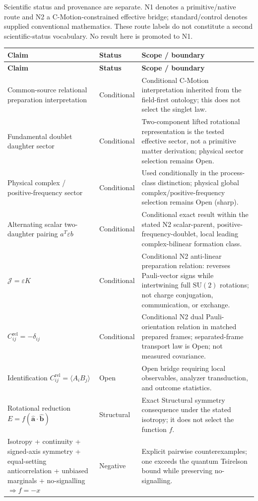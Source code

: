 \documentclass[11pt]{article}
\theoremstyle{remark}
\newcommand{\cmotion}{\mbox{C-Motion}}
\newcommand{\SU}{\mathrm{SU}(2)}
\newcommand{\ahat}{\hat{\bm a}}
\newcommand{\bhat}{\hat{\bm b}}
\newcommand{\epsm}{\varepsilon}
\newcommand{\Jmap}{\mathcal J}
\newcommand{\Crel}{C^{\mathrm{rel}}}
\begin{document}
Scientific status and provenance are separate.  N1 denotes a primitive/native
route and N2 a C-Motion-constrained effective bridge; standard/control denotes
supplied conventional mathematics.  These route labels do not constitute a
second scientific-status vocabulary.  No result here is promoted to N1.

\begingroup
\small
\setlength{\tabcolsep}{3pt}
\begin{longtable}{P{5.0cm}P{3.6cm}P{6.2cm}}
\toprule
\textbf{Claim} & \textbf{Status} & \textbf{Scope / boundary}\\
\midrule
\endfirsthead
\toprule
\textbf{Claim} & \textbf{Status} & \textbf{Scope / boundary}\\
\midrule
\endhead
Common-source relational preparation interpretation & Conditional & Conditional \cmotion{} interpretation inherited from the field-first ontology; this does not select the singlet law.\\
Fundamental doublet daughter sector & Conditional & Two-component lifted rotational representation is the tested effective sector, not a primitive matter derivation; physical sector selection remains Open.\\
Physical complex / positive-frequency sector & Conditional & Used conditionally in the process-class distinction; physical global complex/positive-frequency selection remains Open (sharp).\\
Alternating scalar two-daughter pairing \(a^T\epsm b\) & Conditional & Conditional exact result within the stated N2 scalar-parent, positive-frequency-doublet, local leading complex-bilinear formation class.\\
\(\Jmap=\epsm K\) & Conditional & Conditional N2 anti-linear preparation relation: reverses Pauli-vector signs while intertwining full \(\SU\) rotations; not charge conjugation, communication, or exchange.\\
\(\Crel_{ij}=-\delta_{ij}\) & Conditional & Conditional N2 dual Pauli-orientation relation in matched prepared frames; separated-frame transport law is Open; not measured covariance.\\
Identification \(\Crel_{ij}=\langle A_iB_j\rangle\) & Open & Open bridge requiring local observables, analyzer transduction, and outcome statistics.\\
Rotational reduction \(E=f(\ahat\cdot\bhat)\) & Structural & Exact Structural symmetry consequence under the stated isotropy; it does not select the function \(f\).\\
Isotropy + continuity + signed-axis symmetry + equal-setting anticorrelation + unbiased marginals + no-signalling \(\Rightarrow f=-x\) & Negative & Explicit pairwise counterexamples; one exceeds the quantum Tsirelson bound while preserving no-signalling.\\

\end{longtable}
\end{document}
